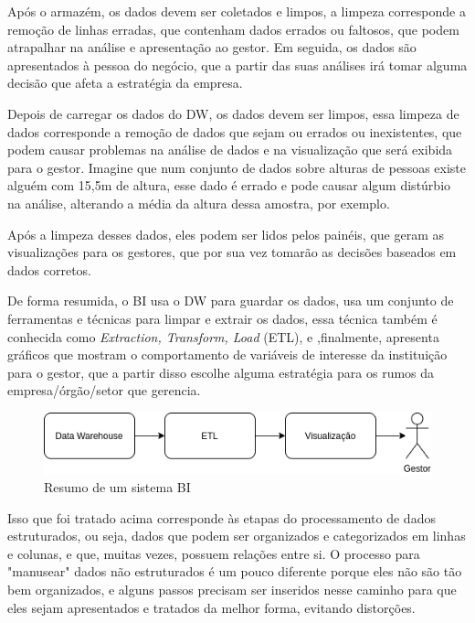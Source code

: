 Após o armazém, os dados devem ser coletados e limpos, a limpeza corresponde a remoção de linhas erradas, que contenham dados errados ou faltosos, que podem atrapalhar na análise e apresentação ao gestor. Em seguida, os dados são apresentados à pessoa do negócio, que a partir das suas análises irá tomar alguma decisão que afeta a estratégia da empresa. 

Depois de carregar os dados do DW, os dados devem ser limpos, essa limpeza de dados corresponde a remoção de dados que sejam ou errados ou inexistentes, que podem causar problemas na análise de dados e na visualização que será exibida para o gestor. Imagine que num conjunto de dados sobre alturas de pessoas existe alguém com 15,5m de altura, esse dado é errado e pode causar algum distúrbio na análise, alterando a média da altura dessa amostra, por exemplo.

Após a limpeza desses dados, eles podem ser lidos pelos painéis, que geram as visualizações para os gestores, que por sua vez tomarão as decisões baseados em dados corretos.  

De forma resumida, o BI usa o DW para guardar os dados, usa um conjunto de ferramentas e técnicas para limpar e extrair os dados, essa técnica também é conhecida como \textit{Extraction, Transform, Load} (ETL), e ,finalmente, apresenta gráficos que mostram o comportamento de variáveis de interesse da instituição para o gestor, que a partir disso escolhe alguma estratégia para os rumos da empresa/órgão/setor que gerencia.

\begin{figure}[h]
	\centering
	\includegraphics[scale=0.80]{./figures/cap1/resumo_bi.png}
	\caption{Resumo de um sistema BI}
\end{figure}

Isso que foi tratado acima corresponde às etapas do processamento de dados estruturados, ou seja, dados que podem ser organizados e categorizados em linhas e colunas, e que, muitas vezes, possuem relações entre si. O processo para "manusear" dados não estruturados é um pouco diferente porque eles não são tão bem organizados, e alguns passos precisam ser inseridos nesse caminho para que eles sejam apresentados e tratados da melhor forma, evitando distorções.

